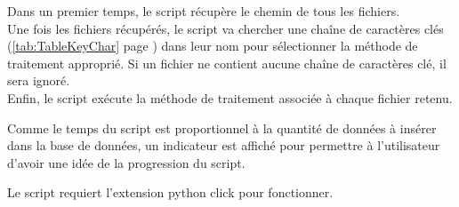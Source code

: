 Dans un premier temps, le script récupère le chemin de tous les fichiers.\\
Une fois les fichiers récupérés, le script va chercher une chaîne de caractères clés (\ref{tab:TableKeyChar} page \pageref{tab:TableKeyChar}) dans leur nom pour sélectionner la méthode de traitement approprié. Si un fichier ne contient aucune chaîne de caractères clé, il sera ignoré.\\
Enfin, le script exécute la méthode de traitement associée à chaque fichier retenu.

Comme le temps du script est proportionnel à la quantité de données à insérer dans la base de données, un indicateur est affiché pour permettre à l'utilisateur d'avoir une idée de la progression du script.

Le script requiert l'extension python click pour fonctionner.


